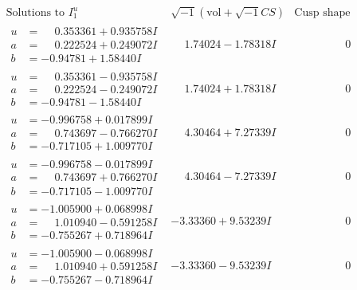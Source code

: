 \documentclass[1p]{elsarticle_modified}
\theoremstyle{definition}
\newcommand{\I}{\sqrt{-1}}
\begin{document}
$$\begin{array}{c|c|c}  
\text{Solutions to }I^u_{1}& \I (\text{vol} + \sqrt{-1}CS) & \text{Cusp shape}\\
 \hline 
\begin{aligned}
u &= \phantom{-}0.353361 + 0.935758 I \\
a &= \phantom{-}0.222524 + 0.249072 I \\
b &= -0.94781 + 1.58440 I\end{aligned}
 & \phantom{-}1.74024 - 1.78318 I & \phantom{-0.000000 } 0 \\ \hline\begin{aligned}
u &= \phantom{-}0.353361 - 0.935758 I \\
a &= \phantom{-}0.222524 - 0.249072 I \\
b &= -0.94781 - 1.58440 I\end{aligned}
 & \phantom{-}1.74024 + 1.78318 I & \phantom{-0.000000 } 0 \\ \hline\begin{aligned}
u &= -0.996758 + 0.017899 I \\
a &= \phantom{-}0.743697 - 0.766270 I \\
b &= -0.717105 + 1.009770 I\end{aligned}
 & \phantom{-}4.30464 + 7.27339 I & \phantom{-0.000000 } 0 \\ \hline\begin{aligned}
u &= -0.996758 - 0.017899 I \\
a &= \phantom{-}0.743697 + 0.766270 I \\
b &= -0.717105 - 1.009770 I\end{aligned}
 & \phantom{-}4.30464 - 7.27339 I & \phantom{-0.000000 } 0 \\ \hline\begin{aligned}
u &= -1.005900 + 0.068998 I \\
a &= \phantom{-}1.010940 - 0.591258 I \\
b &= -0.755267 + 0.718964 I\end{aligned}
 & -3.33360 + 9.53239 I & \phantom{-0.000000 } 0 \\ \hline\begin{aligned}
u &= -1.005900 - 0.068998 I \\
a &= \phantom{-}1.010940 + 0.591258 I \\
b &= -0.755267 - 0.718964 I\end{aligned}
 & -3.33360 - 9.53239 I & \phantom{-0.000000 } 0 \\ \hline\begin{aligned}

\end{aligned}
\end{array}$$
\end{document}
